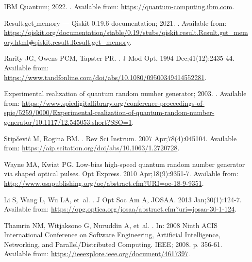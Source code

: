 \documentclass[]{interact}
\theoremstyle{plain}%
\theoremstyle{definition}
\theoremstyle{remark}
\begin{document}
\begin{thebibliography}{100}
{IBM Quantum}; 2022.
.
\newblock Available from: \url{https://quantum-computing.ibm.com}.

{Result.get{$\_$}memory {\ifmmode---\else\textemdash\fi} Qiskit 0.19.6
  documentation}; 2021.
.
\newblock Available from:
  \url{https://qiskit.org/documentation/stable/0.19/stubs/qiskit.result.Result.get_memory.html#qiskit.result.Result.get_memory}.

Rarity JG, Owens PCM, Tapster PR.
.
\newblock J Mod Opt. 1994 Dec;41(12):2435-44.
\newblock Available from:
  \url{https://www.tandfonline.com/doi/abs/10.1080/09500349414552281}.

{Experimental realization of quantum random number generator}; 2003.
.
\newblock Available from:
  \url{https://www.spiedigitallibrary.org/conference-proceedings-of-spie/5259/0000/Experimental-realization-of-quantum-random-number-generator/10.1117/12.545053.short?SSO=1}.

Stip{\ifmmode{}\else\v{c}\fi}evi{\ifmmode{}\else\'{c}\fi} M,
  Rogina BM.
.
\newblock Rev Sci Instrum. 2007 Apr;78(4):045104.
\newblock Available from:
  \url{https://aip.scitation.org/doi/abs/10.1063/1.2720728}.

Wayne MA, Kwiat PG.
\newblock Low-bias high-speed quantum random number generator via shaped
  optical pulses.
\newblock Opt Express. 2010 Apr;18(9):9351-7.
\newblock Available from:
  \url{http://www.osapublishing.org/oe/abstract.cfm?URI=oe-18-9-9351}.

Li S, Wang L, Wu LA, et~al.
.
\newblock J Opt Soc Am A, JOSAA. 2013 Jan;30(1):124-7.
\newblock Available from:
  \url{https://opg.optica.org/josaa/abstract.cfm?uri=josaa-30-1-124}.

Thamrin NM, Witjaksono G, Nuruddin A, et~al.
.
\newblock In: {2008 Ninth ACIS International Conference on Software
  Engineering, Artificial Intelligence, Networking, and Parallel/Distributed
  Computing}. IEEE; 2008. p. 356-61.
\newblock Available from: \url{https://ieeexplore.ieee.org/document/4617397}.


\end{thebibliography}
\end{document}
